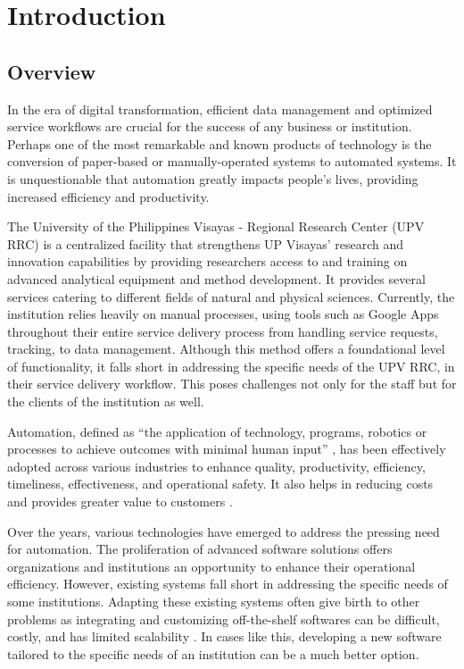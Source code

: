 \chapter{Introduction}
\label{sec:researchdesc}    %

\section{Overview}
\label{sec:overview}

In the era of digital transformation, efficient data management and optimized service workflows are crucial for the success of any business or institution. Perhaps one of the most remarkable and known products of technology is the conversion of paper-based or manually-operated systems to automated systems. It is unquestionable that automation greatly impacts people's lives, providing increased efficiency and productivity.

The University of the Philippines Visayas - Regional Research Center (UPV RRC) is a centralized facility that strengthens UP Visayas’ research and innovation capabilities by providing researchers access to and training on advanced analytical equipment and method development. It provides several services catering to different fields of natural and physical sciences. Currently, the institution relies heavily on manual processes, using tools such as Google Apps throughout their entire service delivery process from handling service requests, tracking, to data management. Although this method offers a foundational level of functionality, it falls short in addressing the specific needs of the UPV RRC, in their service delivery workflow. This poses challenges not only for the staff but for the clients of the institution as well. 

Automation, defined as “the application of technology, programs, robotics or processes to achieve outcomes with minimal human input” \cite{ibm}, has been effectively adopted across various industries to enhance quality, productivity, efficiency, timeliness, effectiveness, and operational safety. It also helps in reducing costs and provides greater value to customers \cite{caban2021}. 

Over the years, various technologies have emerged to address the pressing need for automation. The proliferation of advanced software solutions offers organizations and institutions an opportunity to enhance their operational efficiency. However, existing systems fall short in addressing the specific needs of some institutions. Adapting these existing systems often give birth to other problems as integrating and customizing off-the-shelf softwares can be difficult, costly, and has limited scalability \cite{bitcat2023}. In cases like this, developing a new software tailored to the specific needs of an institution can be a much better option.

